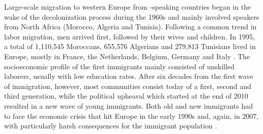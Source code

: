 \documentclass[output=paper]{langsci/langscibook}
\begin{document}
Large-scale migration to western Europe from -speaking countries began in the wake of the decolonization process during the 1960s and mainly involved speakers from North Africa (Morocco, Algeria and Tunisia). Following a common trend in labor migration, men arrived first, followed by their wives and children. In 1995, a total of 1,110,545 Moroccans, 655,576 Algerians and 279,813 Tunisians lived in Europe, mostly in France, the Netherlands, Belgium, Germany and Italy \citep[259--260]{BoumansdeRuiter2002}. The socioeconomic profile of the first immigrants mainly consisted of unskilled laborers, usually with low education rates. After six decades from the first wave of immigration, however, most communities consist today of a first, second and third generation, while the political upheaval which started at the end of 2010 resulted in a new wave of young immigrants. Both old and new immigrants had to face the economic crisis that hit Europe in the early 1990s and, again, in 2007, with particularly harsh consequences for the immigrant population \citep[261]{BoumansdeRuiter2002}.
\end{document}
